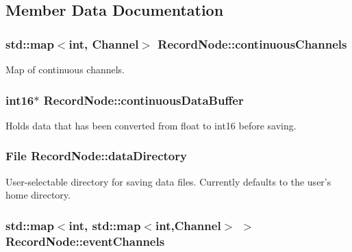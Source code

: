 \subsection{Member Data Documentation}
\hypertarget{classRecordNode_a5a1f8fe9e3100ab74d4bb2650be91f6d}{
\subsubsection[{continuous\-Channels}]{\setlength{\rightskip}{0pt plus 5cm}std\-::map$<$int, {\bf Channel}$>$ Record\-Node\-::continuous\-Channels\hspace{0.3cm}{\ttfamily [private]}}}\label{classRecordNode_a5a1f8fe9e3100ab74d4bb2650be91f6d}
Map of continuous channels. \hypertarget{classRecordNode_a01ef6a171ab8d2a81e5cbc54293ca4cc}{
\subsubsection[{continuous\-Data\-Buffer}]{\setlength{\rightskip}{0pt plus 5cm}int16$\ast$ Record\-Node\-::continuous\-Data\-Buffer\hspace{0.3cm}{\ttfamily [private]}}}\label{classRecordNode_a01ef6a171ab8d2a81e5cbc54293ca4cc}
Holds data that has been converted from float to int16 before saving. \hypertarget{classRecordNode_a5109feb0a2d1821616f3ff8ba04ee8e1}{
\subsubsection[{data\-Directory}]{\setlength{\rightskip}{0pt plus 5cm}File Record\-Node\-::data\-Directory\hspace{0.3cm}{\ttfamily [private]}}}\label{classRecordNode_a5109feb0a2d1821616f3ff8ba04ee8e1}
User-\/selectable directory for saving data files. Currently defaults to the user's home directory. \hypertarget{classRecordNode_a1abec1e7ff14c068315ba3d661339553}{
\subsubsection[{event\-Channels}]{\setlength{\rightskip}{0pt plus 5cm}std\-::map$<$int, std\-::map$<$int,{\bf Channel}$>$ $>$ Record\-Node\-::event\-Channels\hspace{0.3cm}{\ttfamily [private]}}}\label{classRecordNode_a1abec1e7ff14c068315ba3d661339553}
